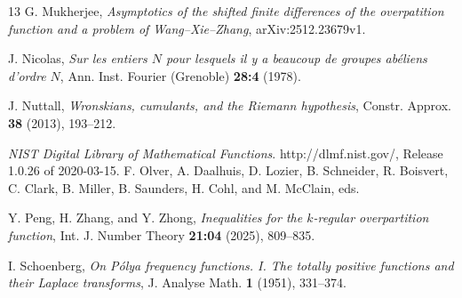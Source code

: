 \documentclass[11pt,reqno,a4paper]{amsart}
\renewcommand{\(}{\left\(}
\renewcommand{\)}{\right\)}
\numberwithin{equation}{section}
\theoremstyle{plain}
\theoremstyle{definition} %
\numberwithin{equation}{section}
\begin{document}
\begin{thebibliography}{13}
		 G. Mukherjee, {\it Asymptotics of the shifted finite differences of the overpatition function and a problem of Wang--Xie--Zhang},  arXiv:2512.23679v1.
		
		 J. Nicolas, {\it Sur les entiers $ N $ pour lesquels il y a beaucoup de groupes ab\'eliens d'ordre $ N$}, Ann. Inst. Fourier (Grenoble) {\bf 28:4} (1978).
		
		 J. Nuttall, {\it Wronskians, cumulants, and the Riemann hypothesis}, Constr. Approx. {\bf 38} (2013), 193--212.
		
		 {\it NIST Digital Library of Mathematical Functions}. http://dlmf.nist.gov/, Release 1.0.26 of 2020-03-15. F. Olver, A. Daalhuis, D. Lozier, B. Schneider, R. Boisvert, C. Clark, B. Miller, B. Saunders, H. Cohl, and M. McClain, eds.
		
		

		
		 Y. Peng, H. Zhang, and Y. Zhong, {\it Inequalities for the $k$-regular
			overpartition function}, Int. J. Number Theory {\bf 21:04} (2025), 809--835. 
		
		 I. Schoenberg, {\it On P\'olya frequency functions. I. The totally positive functions and their Laplace transforms}, J. Analyse Math. {\bf 1} (1951), 331--374.
			
		
		
		
		
	
		


\end{thebibliography}
\end{document}
